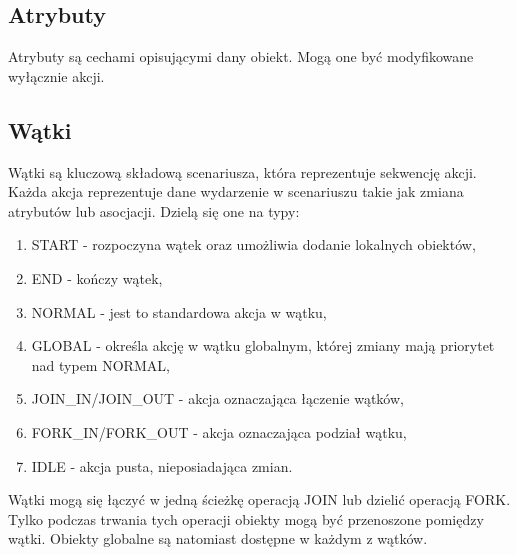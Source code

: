 \subsection{Atrybuty}
Atrybuty są cechami opisującymi dany obiekt. Mogą one być modyfikowane wyłącznie akcji.

\subsection{Wątki}
Wątki są kluczową składową scenariusza, która reprezentuje sekwencję akcji. Każda akcja reprezentuje dane wydarzenie w scenariuszu takie jak zmiana atrybutów lub asocjacji. Dzielą się one na typy:
\begin{enumerate}
\item {START} - rozpoczyna wątek oraz umożliwia dodanie lokalnych obiektów,
\item {END} - kończy wątek,
\item {NORMAL} - jest to standardowa akcja w wątku,
\item {GLOBAL} - określa akcję w wątku globalnym, której zmiany mają priorytet nad typem NORMAL,
\item {JOIN\_IN/JOIN\_OUT} - akcja oznaczająca łączenie wątków,
\item {FORK\_IN/FORK\_OUT} - akcja oznaczająca podział wątku,
\item {IDLE} - akcja pusta, nieposiadająca zmian.
\end{enumerate}
Wątki mogą się łączyć w jedną ścieżkę operacją JOIN lub dzielić operacją FORK. Tylko podczas
trwania tych operacji obiekty mogą być przenoszone pomiędzy wątki. Obiekty globalne są natomiast dostępne w każdym z wątków.

\newpage
